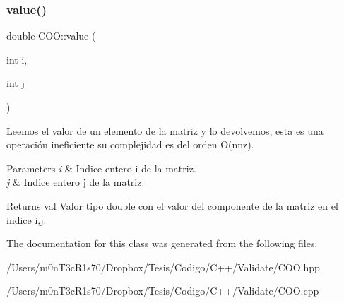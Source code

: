 \subsubsection{\texorpdfstring{value()}{value()}}
{\footnotesize\ttfamily double C\+O\+O\+::value (\begin{DoxyParamCaption}\item[{int}]{i,  }\item[{int}]{j }\end{DoxyParamCaption})}



Leemos el valor de un elemento de la matriz y lo devolvemos, esta es una operación ineficiente su complejidad es del orden O(nnz). 


\begin{DoxyParams}{Parameters}
{\em i} & Indice entero i de la matriz. \\
\hline
{\em j} & Indice entero j de la matriz. \\
\hline
\end{DoxyParams}
\begin{DoxyReturn}{Returns}
val Valor tipo double con el valor del componente de la matriz en el indice i,j. 
\end{DoxyReturn}


The documentation for this class was generated from the following files\+:\begin{DoxyCompactItemize}
\item 
/\+Users/m0n\+T3c\+R1s70/\+Dropbox/\+Tesis/\+Codigo/\+C++/\+Validate/C\+O\+O.\+hpp\item 
/\+Users/m0n\+T3c\+R1s70/\+Dropbox/\+Tesis/\+Codigo/\+C++/\+Validate/C\+O\+O.\+cpp\end{DoxyCompactItemize}
